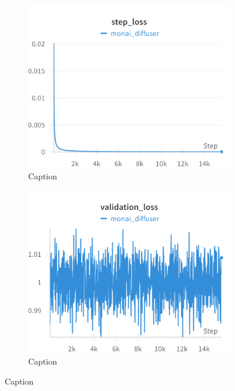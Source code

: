 \begin{figure}[H]
\centering
\begin{subfigure}[h]{.45\linewidth}
    \includegraphics[width=\linewidth]{detailed_engineering/Monai Diffusion - Attempt 2/charts/step_loss.png}
    \caption{Caption}
    \label{fig:enter-label}
\end{subfigure}
\hfill
\begin{subfigure}[h]{.45\linewidth}
    \includegraphics[width=\linewidth]{detailed_engineering/Monai Diffusion - Attempt 2/charts/val_loss.png}
    \caption{Caption}
    \label{fig:enter-label}
\end{subfigure}
\end{figure}



